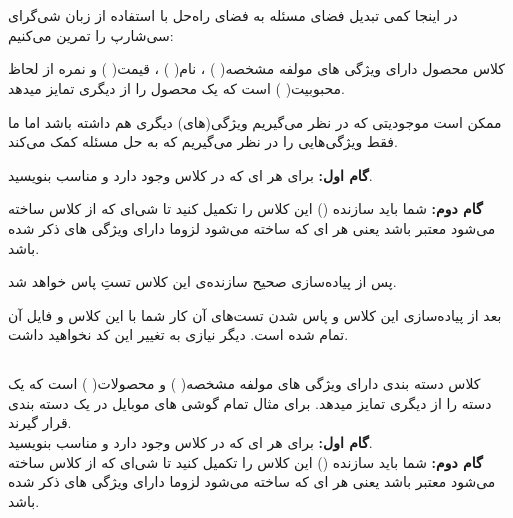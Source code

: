 \section{
        \grayBox{\textcolor{purple}{APKALA}}
        \grayBox{\textcolor{blue}{}}
    }
    \RTL
        \subsection{ }
    در اینجا کمی تبدیل فضای مسئله به فضای راه‌حل با استفاده از زبان شی‌گرای سی‌شارپ را تمرین می‌کنیم:
    
    کلاس محصول دارای ویژگی های 
    مولفه مشخصه(
     \grayBox{\textcolor{navyBlue}{Id}}
    )
    ،
    نام(
    \grayBox{\textcolor{navyBlue}{Name}}
    )
    ،
    قیمت(
    \grayBox{\textcolor{navyBlue}{Price}}
    )
    و 
    نمره از لحاظ محبوبیت(
    \grayBox{\textcolor{navyBlue}{Rate}}
    )
    است که یک محصول را از دیگری تمایز میدهد.
    
    
     ممکن است موجودیتی که در نظر می‌گیریم ویژگی(های) دیگری هم داشته باشد اما ما فقط ویژگی‌هایی را در نظر می‌گیریم که به حل مسئله کمک می‌کند.
    
    \textbf{گام اول:}
     برای هر 
    \grayBox{\textcolor{navyBlue}{property}}ای 
    که در کلاس وجود دارد 
    \grayBox{\textcolor{navyBlue}{getter}}
    و 
    \grayBox{\textcolor{navyBlue}{setter}}
    مناسب بنویسید.
    
    \textbf{گام دوم: }
    شما باید سازنده
    (\grayBox{\textcolor{navyBlue}{constructor}}) 
    این کلاس را تکمیل کنید تا شی‌ای که از کلاس ساخته می‌شود معتبر باشد یعنی هر 
    \grayBox{\textcolor{navyBlue}{Product}}ای 
    که ساخته می‌شود لزوما دارای ویژگی های ذکر شده باشد.
    
    پس از پیاده‌سازی صحیح سازنده‌ی این کلاس تستِ 
    \grayBox{\textcolor{dkgreen}{ProductConstructorTest}}
    پاس خواهد شد.
    
    بعد از پیاده‌سازی این کلاس و پاس شدن تست‌های آن کار شما با این کلاس و فایل آن تمام شده است. دیگر نیازی به تغییر این کد نخواهید داشت.
    
    \subsection{ }
    
    کلاس دسته بندی دارای ویژگی های 
    مولفه مشخصه(
     \grayBox{\textcolor{navyBlue}{Id}}
    )
    و 
    محصولات(
    \grayBox{\textcolor{navyBlue}{Products}}
    )
    است که یک دسته را از دیگری تمایز میدهد.
    برای مثال تمام گوشی های موبایل در یک دسته بندی قرار گیرند.
    \\
    \textbf{گام اول:}
     برای هر 
    \grayBox{\textcolor{navyBlue}{property}}ای 
    که در کلاس وجود دارد 
    \grayBox{\textcolor{navyBlue}{getter}}
    و 
    \grayBox{\textcolor{navyBlue}{setter}}
    مناسب بنویسید.
    \\
    \textbf{گام دوم: }
    شما باید سازنده
    (\grayBox{\textcolor{navyBlue}{constructor}}) 
    این کلاس را تکمیل کنید تا شی‌ای که از کلاس ساخته می‌شود معتبر باشد یعنی هر 
    \grayBox{\textcolor{navyBlue}{Category}}ای 
    که ساخته می‌شود لزوما دارای ویژگی های ذکر شده باشد.
    
